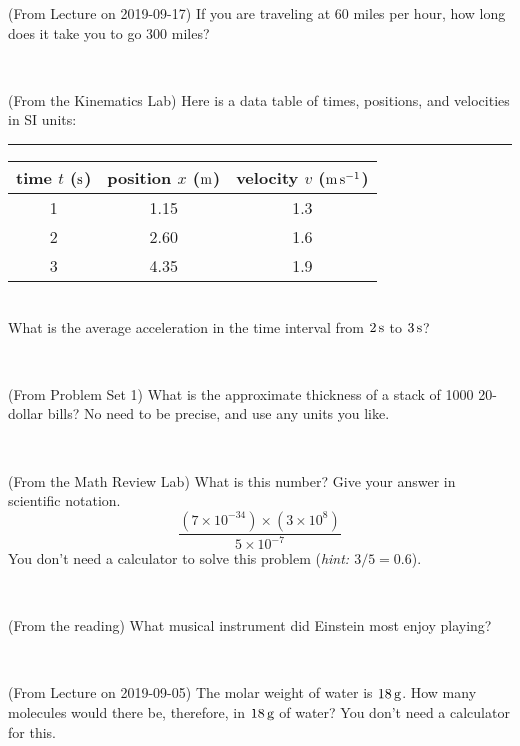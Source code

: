 \documentclass[12pt, letterpaper]{article}
\begin{document}
\begin{problem} (From Lecture on 2019-09-17)
If you are traveling at 60 miles per hour, how long does
it take you to go 300 miles?
\end{problem}


\vfill ~

\begin{problem} (From the Kinematics Lab)
Here is a data table of times, positions, and velocities in SI units:\\
\rule{1.0in}{0pt}\begin{tabular}{c|c|c}
time $t$ ($\mathrm{s}$) & position $x$ ($\mathrm{m}$) & velocity $v$ ($\mathrm{m}\,\mathrm{s}^{-1}$) \\
\hline
1 & 1.15 & 1.3 \\
2 & 2.60 & 1.6 \\
3 & 4.35 & 1.9 \\
\hline
\end{tabular}\\
What is the average acceleration in the time interval from $2\,\mathrm{s}$ to $3\,\mathrm{s}$?
\end{problem}


\vfill ~


\clearpage


\begin{problem} (From Problem Set 1)
What is the approximate thickness of a stack of 1000 20-dollar bills?
No need to be precise, and use any units you like.
\end{problem}


\vfill ~

\begin{problem} (From the Math Review Lab)
What is this number? Give your answer in scientific notation.
$$
\frac{(7\times10^{-34})\times(3\times10^8)}{5\times10^{-7}}
$$
You don't need a calculator to solve this problem (\textit{hint: $3/5=0.6$}).
\end{problem}


\vfill ~

\begin{problem} (From the reading)
What musical instrument did Einstein most enjoy playing?
\end{problem}


\vfill ~

\begin{problem} (From Lecture on 2019-09-05)
The molar weight of water is $18\,\mathrm{g}$. How many molecules would there
be, therefore, in $18\,\mathrm{g}$ of water? You don't need a calculator for
this.
\end{problem}
\end{document}
